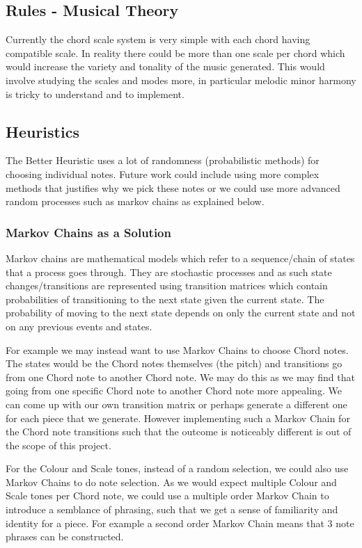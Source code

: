 \documentclass[pdftex,12pt,a4paper]{report}
\begin{document}
\subsection{Rules - Musical Theory}
Currently the chord scale system is very simple with each chord having compatible scale. In reality there could be more than one scale per chord which would increase the variety and tonality of the music generated. This would involve studying the scales and modes more, in particular melodic minor harmony is tricky to understand and to implement.

\subsection{Heuristics}
The Better Heuristic uses a lot of randomness (probabilistic methods) for choosing individual notes. Future work could include using more complex methods that justifies why we pick these notes or we could use more advanced random processes such as markov chains as explained below.

\subsubsection{Markov Chains as a Solution}
Markov chains are mathematical models which refer to a sequence/chain of states that a process goes through. They are stochastic processes and as such state changes/transitions are represented using transition matrices which contain probabilities of transitioning to the next state given the current state. The probability of moving to the next state depends on only the current state and not on any previous events and states.
 
For example we may instead want to use Markov Chains to choose Chord notes. The states would be the Chord notes themselves (the pitch) and transitions go from one Chord note to another Chord note. We may do this as we may find that going from one specific Chord note to another Chord note more appealing. We can come up with our own transition matrix or perhaps generate a different one for each piece that we generate. However implementing such a Markov Chain for the Chord note transitions such that the outcome is noticeably different is out of the scope of this project.

For the Colour and Scale tones, instead of a random selection, we could also use Markov Chains to do note selection. As we would expect multiple Colour and Scale tones per Chord note, we could use a multiple order Markov Chain to introduce a semblance of phrasing, such that we get a sense of familiarity and identity for a piece. For example a second order Markov Chain means that 3 note phrases can be constructed. 
\end{document}
